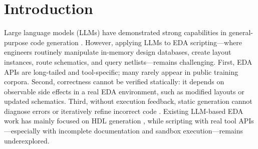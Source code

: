 \section{Introduction}
\label{sec:introduction}

Large language models (LLMs) have demonstrated strong capabilities in general-purpose code generation \cite{vaswani2017attention, openai2023gpt4, yang2025qwen3}. However, applying LLMs to EDA scripting—where engineers routinely manipulate in-memory design databases, create layout instances, route schematics, and query netlists—remains challenging. First, EDA APIs are long-tailed and tool-specific; many rarely appear in public training corpora. Second, correctness cannot be verified statically: it depends on observable side effects in a real EDA environment, such as modified layouts or updated schematics. Third, without execution feedback, static generation cannot diagnose errors or iteratively refine incorrect code \cite{chen2024dawning, blocklove2024eda}. Existing LLM-based EDA work has mainly focused on HDL generation \cite{thakur2023verigen, liu2023rtlcoder}, while scripting with real tool APIs—especially with incomplete documentation and sandbox execution—remains underexplored.

